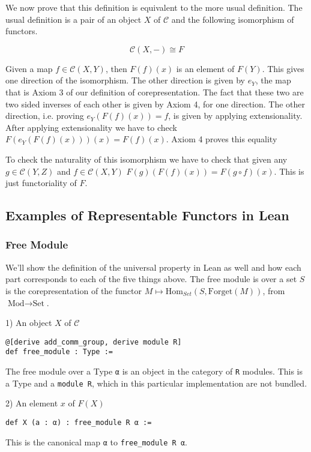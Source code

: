 \documentclass[12pt]{article} %
\theoremstyle{definition}
\theoremstyle{definition}
\theoremstyle{definition}
\theoremstyle{definition}
\begin{document}
We now prove that this definition is equivalent to the more usual definition.
The usual definition is a pair of an object $X$ of $\mathcal{C}$ and 
the following isomorphism of functors.

\begin{equation}
\mathcal{C}(X, -) \cong F
\end{equation}

Given a map $f \in \mathcal{C}(X, Y)$, then $F(f)(x)$ is an element of $F(Y)$. This gives one 
direction of the isomorphism. The other direction is given by $e_Y$, the map that is
Axiom 3 of our definition of corepresentation. The fact that these two are two sided inverses
of each other is given by Axiom 4, for one direction. The other direction, i.e.
proving $e_Y(F(f)(x)) = f$, is given by applying extensionality.
After applying extensionality we have to check $F(e_Y(F(f)(x)))(x) = F(f)(x)$. 
Axiom 4 proves this equality

To check the naturality of this isomorphism we have to check that given 
any $g \in \mathcal{C}(Y,Z)$ and $f \in \mathcal{C}(X, Y)$
$F(g)(F(f)(x)) = F(g \circ f)(x)$. This is just functoriality of $F$.

\subsection{Examples of Representable Functors in Lean}

\subsubsection{Free Module}
We'll show the definition of the universal property in Lean as well and how each part corresponds to each
of the five things above. The free module is over a set $S$ is the corepresentation of the functor 
$M \mapsto \text{Hom}_{Set}(S, \text{Forget}(M))$, from $\text{Mod} \to \text{Set}$.

1) An object $X$ of $\mathcal{C}$
\begin{lstlisting}
@[derive add_comm_group, derive module R]
def free_module : Type :=
\end{lstlisting}
The free module over a Type \lstinline{α} is an object in the category of \lstinline{R}
modules. This is a Type and a \lstinline{module R}, which in this particular implementation
are not bundled.


2) An element $x$ of $F(X)$
\begin{lstlisting}
def X (a : α) : free_module R α :=
\end{lstlisting}
This is the canonical map \lstinline{α} to \lstinline{free_module R α}.
\end{document}
